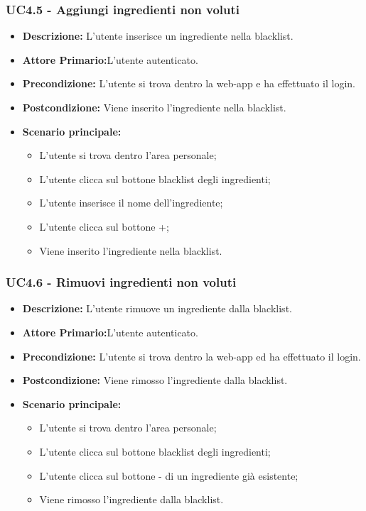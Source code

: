 \subsubsection{UC4.5 - Aggiungi ingredienti non voluti}
\begin{itemize}
    \item \textbf{Descrizione:} L'utente inserisce un ingrediente nella blacklist.
    \item \textbf{Attore Primario:}L'utente autenticato.
    \item \textbf{Precondizione:} L'utente si trova dentro la web-app e ha effettuato il login.
    \item \textbf{Postcondizione:} Viene inserito l'ingrediente nella blacklist.
    \item \textbf{Scenario principale:}
    \begin{itemize}
        \item L'utente si trova dentro l'area personale;
        \item L'utente clicca sul bottone blacklist degli ingredienti;
        \item L'utente inserisce il nome dell'ingrediente;
        \item L'utente clicca sul bottone +;
        \item Viene inserito l'ingrediente nella blacklist.
    \end{itemize}
\end{itemize}
\subsubsection{UC4.6 - Rimuovi ingredienti non voluti}
\begin{itemize}
    \item \textbf{Descrizione:} L'utente rimuove un ingrediente dalla blacklist.
    \item \textbf{Attore Primario:}L'utente autenticato.
    \item \textbf{Precondizione:} L'utente si trova dentro la web-app ed ha effettuato il login.
    \item \textbf{Postcondizione:} Viene rimosso l'ingrediente dalla blacklist.
    \item \textbf{Scenario principale:}
    \begin{itemize}
        \item L'utente si trova dentro l'area personale;
        \item L'utente clicca sul bottone blacklist degli ingredienti;
        \item L'utente clicca sul bottone - di un ingrediente già esistente;
        \item Viene rimosso l'ingrediente dalla blacklist.
    \end{itemize}
\end{itemize}
